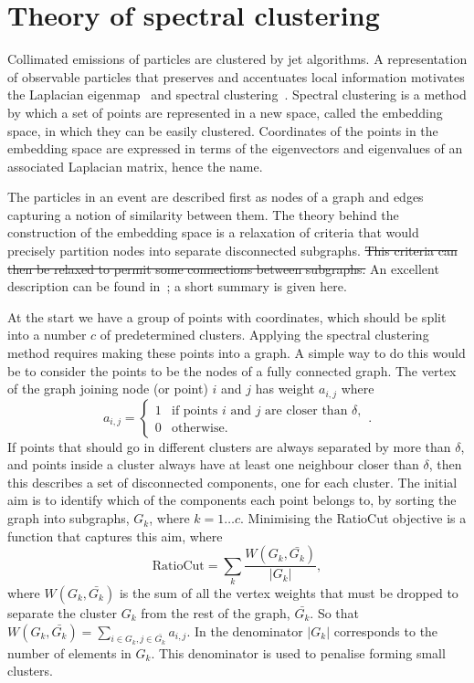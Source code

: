 \section{Theory of spectral clustering}\label{sec:spectral_theory}

{\color{magenta} Collimated emissions of particles are clustered by jet algorithms.  A
representation of observable particles that preserves and accentuates local information
motivates the Laplacian eigenmap~\cite{BelkinNiyogi2003} and spectral
clustering~\cite{NgJordanWeiss2002}.}  
Spectral clustering is a method by which a set of points are represented in a new space,
called the embedding space, in which they can be easily clustered.  Coordinates of the
points in the embedding space are expressed in terms of the eigenvectors and eigenvalues
of an associated Laplacian matrix, hence the name.

%
{\color{magenta} The particles in an event are described first as nodes of a graph and
edges capturing a notion of similarity between them.}  The theory behind the
construction of the embedding space is a relaxation of criteria that would precisely
partition nodes into separate disconnected subgraphs.
\sout{This criteria can then be relaxed to permit some connections between subgraphs.}
An excellent description can be found in~\cite{luxburg2007spectraltutorial}; a short
summary is given here.

At the start we have a group of points with coordinates, which should be split into a  number \(c\) of predetermined clusters.
Applying the spectral clustering method requires making these points into a graph.
A simple way to do this would be to consider the points to be the nodes of a fully connected graph.
The vertex of the graph joining node (or point) \(i\) and \(j\) has weight \(a_{i, j}\) where
\begin{equation}
    a_{i, j}= 
    \begin{cases}
        1 & \text{if points } i \text{ and } j \text{ are closer than } \delta, \\
        0              & \text{otherwise.}
    \end{cases}
    .
\end{equation}
%
If points that should go in different clusters are always separated by more than \(\delta\),
and points inside a cluster always have at least one neighbour closer than \(\delta\),
then this describes a set of disconnected components, one for each cluster.
%
The initial aim is to identify which of the components each point belongs to,
by sorting the graph into subgraphs, \(G_k\), where \(k=1 \dots c\).
Minimising the RatioCut objective is a function that captures this aim, where 
\begin{equation}
    \text{RatioCut} = \sum_k\frac{W(G_k, \bar{G_k})}{|G_k|},
\end{equation}\label{eqn:cost_function}
where \(W(G_k, \bar{G_k})\) is the sum of all the vertex weights that must be dropped
to separate the cluster \(G_k\) from the rest of the graph, \(\bar{G_k}\).
So that \( W(G_k, \bar{G_k}) = \sum_{i \in G_k, j \in \bar{G_k}} a_{i, j} \).
In the denominator \(|G_k|\) corresponds to the number of elements in \(G_k\).
This denominator is used to penalise forming small clusters.

